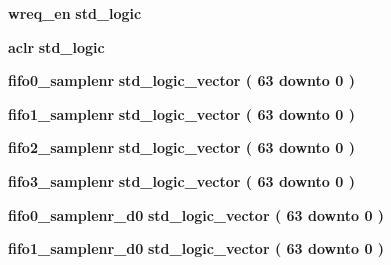 \begin{DoxyCompactItemize}
\item 
{\bf wreq\+\_\+en} {\bfseries \textcolor{comment}{std\+\_\+logic}\textcolor{vhdlchar}{ }} 
\item 
{\bf aclr} {\bfseries \textcolor{comment}{std\+\_\+logic}\textcolor{vhdlchar}{ }} 
\item 
{\bf fifo0\+\_\+samplenr} {\bfseries \textcolor{comment}{std\+\_\+logic\+\_\+vector}\textcolor{vhdlchar}{ }\textcolor{vhdlchar}{(}\textcolor{vhdlchar}{ }\textcolor{vhdlchar}{ } \textcolor{vhdldigit}{63} \textcolor{vhdlchar}{ }\textcolor{keywordflow}{downto}\textcolor{vhdlchar}{ }\textcolor{vhdlchar}{ } \textcolor{vhdldigit}{0} \textcolor{vhdlchar}{ }\textcolor{vhdlchar}{)}\textcolor{vhdlchar}{ }} 
\item 
{\bf fifo1\+\_\+samplenr} {\bfseries \textcolor{comment}{std\+\_\+logic\+\_\+vector}\textcolor{vhdlchar}{ }\textcolor{vhdlchar}{(}\textcolor{vhdlchar}{ }\textcolor{vhdlchar}{ } \textcolor{vhdldigit}{63} \textcolor{vhdlchar}{ }\textcolor{keywordflow}{downto}\textcolor{vhdlchar}{ }\textcolor{vhdlchar}{ } \textcolor{vhdldigit}{0} \textcolor{vhdlchar}{ }\textcolor{vhdlchar}{)}\textcolor{vhdlchar}{ }} 
\item 
{\bf fifo2\+\_\+samplenr} {\bfseries \textcolor{comment}{std\+\_\+logic\+\_\+vector}\textcolor{vhdlchar}{ }\textcolor{vhdlchar}{(}\textcolor{vhdlchar}{ }\textcolor{vhdlchar}{ } \textcolor{vhdldigit}{63} \textcolor{vhdlchar}{ }\textcolor{keywordflow}{downto}\textcolor{vhdlchar}{ }\textcolor{vhdlchar}{ } \textcolor{vhdldigit}{0} \textcolor{vhdlchar}{ }\textcolor{vhdlchar}{)}\textcolor{vhdlchar}{ }} 
\item 
{\bf fifo3\+\_\+samplenr} {\bfseries \textcolor{comment}{std\+\_\+logic\+\_\+vector}\textcolor{vhdlchar}{ }\textcolor{vhdlchar}{(}\textcolor{vhdlchar}{ }\textcolor{vhdlchar}{ } \textcolor{vhdldigit}{63} \textcolor{vhdlchar}{ }\textcolor{keywordflow}{downto}\textcolor{vhdlchar}{ }\textcolor{vhdlchar}{ } \textcolor{vhdldigit}{0} \textcolor{vhdlchar}{ }\textcolor{vhdlchar}{)}\textcolor{vhdlchar}{ }} 
\item 
{\bf fifo0\+\_\+samplenr\+\_\+d0} {\bfseries \textcolor{comment}{std\+\_\+logic\+\_\+vector}\textcolor{vhdlchar}{ }\textcolor{vhdlchar}{(}\textcolor{vhdlchar}{ }\textcolor{vhdlchar}{ } \textcolor{vhdldigit}{63} \textcolor{vhdlchar}{ }\textcolor{keywordflow}{downto}\textcolor{vhdlchar}{ }\textcolor{vhdlchar}{ } \textcolor{vhdldigit}{0} \textcolor{vhdlchar}{ }\textcolor{vhdlchar}{)}\textcolor{vhdlchar}{ }} 
\item 
{\bf fifo1\+\_\+samplenr\+\_\+d0} {\bfseries \textcolor{comment}{std\+\_\+logic\+\_\+vector}\textcolor{vhdlchar}{ }\textcolor{vhdlchar}{(}\textcolor{vhdlchar}{ }\textcolor{vhdlchar}{ } \textcolor{vhdldigit}{63} \textcolor{vhdlchar}{ }\textcolor{keywordflow}{downto}\textcolor{vhdlchar}{ }\textcolor{vhdlchar}{ } \textcolor{vhdldigit}{0} \textcolor{vhdlchar}{ }\textcolor{vhdlchar}{)}\textcolor{vhdlchar}{ }} 

\end{DoxyCompactItemize}
